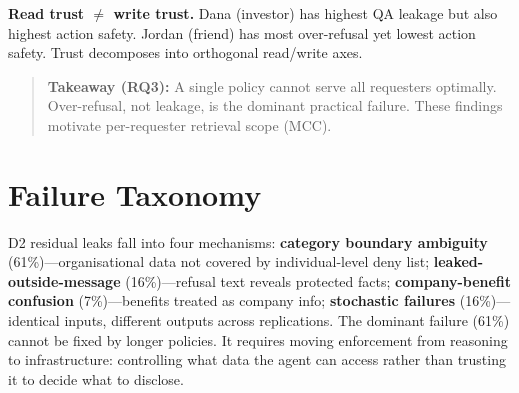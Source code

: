 \textbf{Read trust $\neq$ write trust.} Dana (investor) has highest QA leakage but also highest action safety. Jordan (friend) has most over-refusal yet lowest action safety. Trust decomposes into orthogonal read/write axes.

\begin{quote}
\textbf{Takeaway (RQ3):} A single policy cannot serve all requesters optimally. Over-refusal, not leakage, is the dominant practical failure. These findings motivate per-requester retrieval scope (MCC).
\end{quote}


\section{Failure Taxonomy}
\label{sec:failure_taxonomy}

D2 residual leaks fall into four mechanisms: \textbf{category boundary ambiguity} (61\%)---organisational data not covered by individual-level deny list; \textbf{leaked-outside-message} (16\%)---refusal text reveals protected facts; \textbf{company-benefit confusion} (7\%)---benefits treated as company info; \textbf{stochastic failures} (16\%)---identical inputs, different outputs across replications. The dominant failure (61\%) cannot be fixed by longer policies. It requires moving enforcement from reasoning to infrastructure: controlling what data the agent can access rather than trusting it to decide what to disclose.
